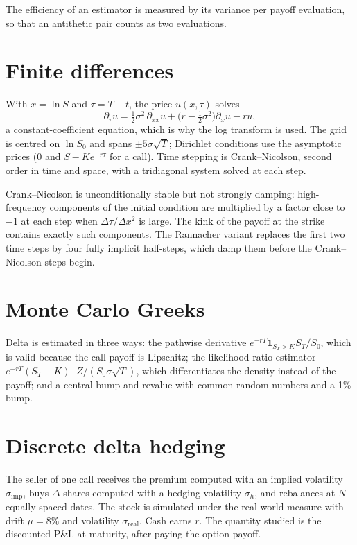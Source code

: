 \documentclass[11pt,a4paper,oneside]{report}
\begin{document}
The efficiency of an estimator is measured by its variance per payoff evaluation, so that an antithetic pair counts as two evaluations.

\section{Finite differences}
With $x=\ln S$ and $\tau=T-t$, the price $u(x,\tau)$ solves
\begin{equation}
\partial_\tau u = \tfrac12\sigma^2\,\partial_{xx}u + \big(r-\tfrac12\sigma^2\big)\partial_x u - r u ,
\end{equation}
a constant-coefficient equation, which is why the log transform is used. The grid is centred on $\ln S_0$ and spans $\pm5\sigma\sqrt T$; Dirichlet conditions use the asymptotic prices ($0$ and $S-Ke^{-r\tau}$ for a call). Time stepping is Crank--Nicolson, second order in time and space, with a tridiagonal system solved at each step.

Crank--Nicolson is unconditionally stable but not strongly damping: high-frequency components of the initial condition are multiplied by a factor close to $-1$ at each step when $\Delta\tau/\Delta x^2$ is large. The kink of the payoff at the strike contains exactly such components. The Rannacher variant replaces the first two time steps by four fully implicit half-steps, which damp them before the Crank--Nicolson steps begin.

\section{Monte Carlo Greeks}
Delta is estimated in three ways: the pathwise derivative $e^{-rT}\mathbf 1_{S_T>K}S_T/S_0$, which is valid because the call payoff is Lipschitz; the likelihood-ratio estimator $e^{-rT}(S_T-K)^+ Z/(S_0\sigma\sqrt T)$, which differentiates the density instead of the payoff; and a central bump-and-revalue with common random numbers and a 1\% bump.

\section{Discrete delta hedging}
The seller of one call receives the premium computed with an implied volatility $\sigma_{\text{imp}}$, buys $\Delta$ shares computed with a hedging volatility $\sigma_h$, and rebalances at $N$ equally spaced dates. The stock is simulated under the real-world measure with drift $\mu=8\%$ and volatility $\sigma_{\text{real}}$. Cash earns $r$. The quantity studied is the discounted P\&L at maturity, after paying the option payoff.
\end{document}
